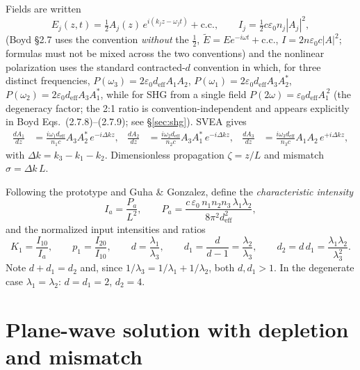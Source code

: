 \documentclass[aps,pra,preprint,amsmath,amssymb,nofootinbib,superscriptaddress]{revtex4-2}
\newcommand{\deff}{d_{\mathrm{eff}}}
\begin{document}
Fields are written
\begin{equation}
E_j(z,t) = \tfrac12 A_j(z)\, e^{i(k_j z-\omega_j t)} + \mathrm{c.c.},
\qquad
I_j = \tfrac12 c\varepsilon_0 n_j |A_j|^2 ,
\label{eq:fieldconv}
\end{equation}
(Boyd \S2.7 uses the convention \emph{without} the $\tfrac12$,
$\tilde E=Ee^{-i\omega t}+\mathrm{c.c.}$, $I=2n\varepsilon_0c|A|^2$; formulas
must not be mixed across the two conventions)
and the nonlinear polarization uses the standard contracted-$d$ convention
in which, for three distinct frequencies,
$P(\omega_3)=2\varepsilon_0\deff A_1A_2$,
$P(\omega_1)=2\varepsilon_0\deff A_3A_2^*$,
$P(\omega_2)=2\varepsilon_0\deff A_3A_1^*$, while for SHG from a single
field $P(2\omega)=\varepsilon_0\deff A_1^{\,2}$
(the degeneracy factor; the 2:1 ratio is convention-independent and appears
explicitly in Boyd Eqs.~(2.7.8)--(2.7.9); see \S\ref{sec:shg}). SVEA gives
\begin{align}
\frac{dA_1}{dz} &= \frac{i\omega_1 \deff}{n_1 c} A_3 A_2^*\, e^{-i\Delta k z},&
\frac{dA_2}{dz} &= \frac{i\omega_2 \deff}{n_2 c} A_3 A_1^*\, e^{-i\Delta k z},&
\frac{dA_3}{dz} &= \frac{i\omega_3 \deff}{n_3 c} A_1 A_2\, e^{+i\Delta k z},
\label{eq:coupled}
\end{align}
with $\Delta k=k_3-k_1-k_2$. Dimensionless propagation $\zeta=z/L$ and
mismatch $\sigma=\Delta k\,L$.

Following the prototype and Guha \& Gonzalez, define the
\emph{characteristic intensity}
\begin{equation}
I_a=\frac{P_a}{L^{2}},\qquad
P_a=\frac{c\,\varepsilon_0\, n_1 n_2 n_3\, \lambda_1\lambda_2}
         {8\pi^{2}\deff^{2}},
\label{eq:Ia}
\end{equation}
and the normalized input intensities and ratios
\begin{equation}
K_1=\frac{I_{10}}{I_a},\qquad
p_1=\frac{I_{20}}{I_{10}},\qquad
d=\frac{\lambda_1}{\lambda_3},\qquad
d_1=\frac{d}{d-1}=\frac{\lambda_2}{\lambda_3},\qquad
d_2=d\,d_1=\frac{\lambda_1\lambda_2}{\lambda_3^{2}} .
\label{eq:ratios}
\end{equation}
Note $d+ d_1 = d_2$ and, since
$1/\lambda_3=1/\lambda_1+1/\lambda_2$, both $d,d_1>1$. In the degenerate
case $\lambda_1=\lambda_2$: $d=d_1=2$, $d_2=4$.

\section{Plane-wave solution with depletion and mismatch}\label{sec:pw}
\end{document}
